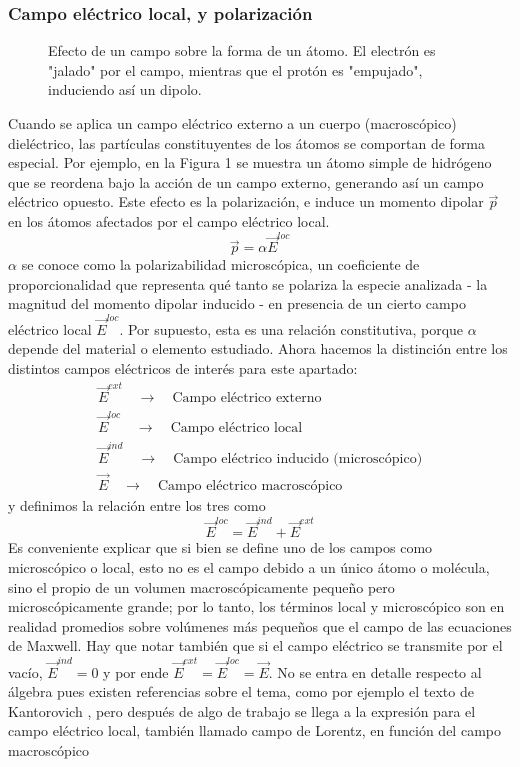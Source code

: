 \documentclass[12pt, notitlepage]{article}
\begin{document}
\subsubsection{Campo eléctrico local, y polarización}
\begin{figure}[H]
\centering

\caption{Efecto de un campo sobre la forma de un átomo. El electrón es "jalado" por el campo, mientras que el protón es "empujado", induciendo así un dipolo.}
\end{figure}
Cuando se aplica un campo eléctrico externo a un cuerpo (macroscópico) dieléctrico, las partículas constituyentes de los átomos se comportan de forma especial. Por ejemplo, en la Figura 1 se muestra un átomo simple de hidrógeno que se reordena bajo la acción de un campo externo, generando así un campo eléctrico opuesto. Este efecto es la polarización, e induce un momento dipolar $\vec{p}$ en los átomos afectados por el campo eléctrico local.
\begin{equation}
\vec{p} = \alpha\vec{E}^{loc}
\end{equation}
$\alpha$ se conoce como la polarizabilidad microscópica, un coeficiente de proporcionalidad que representa qué tanto se polariza la especie analizada - la magnitud del momento dipolar inducido - en presencia de un cierto campo eléctrico local $\vec{E}^{loc}$. Por supuesto, esta es una relación constitutiva, porque $\alpha$ depende del material o elemento estudiado. Ahora hacemos la distinción entre los distintos campos eléctricos de interés para este apartado:
\begin{gather*}
\vec{E}^{ext} \quad \longrightarrow \quad \text{Campo eléctrico externo}\\
\vec{E}^{loc} \quad \longrightarrow \quad \text{Campo eléctrico local}\\
\vec{E}^{ind} \quad \longrightarrow \quad \text{Campo eléctrico inducido (microscópico)}\\
\vec{E} \quad \longrightarrow \quad \text{Campo eléctrico macroscópico}
\end{gather*}
y definimos la relación entre los tres como
\begin{equation}
\vec{E}^{loc} = \vec{E}^{ind} + \vec{E}^{ext}
\end{equation}
Es conveniente explicar que si bien se define uno de los campos como microscópico o local, esto no es el campo debido a un único átomo o molécula, sino el propio de un volumen macroscópicamente pequeño pero microscópicamente grande; por lo tanto, los términos local y microscópico son en realidad promedios sobre volúmenes más pequeños que el campo de las ecuaciones de Maxwell. Hay que notar también que si el campo eléctrico se transmite por el vacío, $\vec{E}^{ind} = 0$ y por ende $\vec{E}^{ext} = \vec{E}^{loc} = \vec{E}$. No se entra en detalle respecto al álgebra pues existen referencias sobre el tema, como por ejemplo el texto de Kantorovich \cite{Kantorovich}, pero después de algo de trabajo se llega a la expresión para el campo eléctrico local, también llamado campo de Lorentz, en función del campo macroscópico
\end{document}
